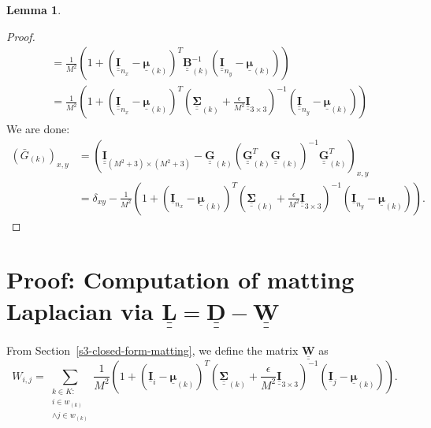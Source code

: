 \documentclass{article}
\theoremstyle{definition}
\newtheorem{lemma}[theorem]{Lemma}
\def\vt#1{\underline{\mathbf{#1}}}
\def\vts#1{\underline{\boldsymbol{#1}}}
\def\mt#1{\underline{\underline{\mathbf{#1}}}}
\def\mts#1{\underline{\underline{\boldsymbol{#1}}}}
\begin{document}
\begin{lemma}
\begin{proof}
\begin{align*}
            &= \frac1{M^2} \left(1 + \left(\mt I_{n_x} - \vts \mu_{(k)}\right)^T \mt B_{(k)}^{-1} \left(\mt I_{n_y} - \vts \mu_{(k)}\right)\right)\\
            &= \frac1{M^2} \left(1 + \left(\mt I_{n_x} - \vts \mu_{(k)}\right)^T \left(\mts \Sigma_{(k)}+\frac\epsilon{M^2}\mt I_{3\times 3}\right)^{-1} \left(\mt I_{n_y} - \vts \mu_{(k)}\right)\right)
        \end{align*}
        We are done:
        \begin{align*}
            \left({\bar{G}}_{(k)}\right)_{x,y} &= \left(\mt I_{(M^2+3)\times(M^2+3)} - \mt G_{(k)} \left(\mt G_{(k)}^T \mt G_{(k)}\right)^{-1} \mt G_{(k)}^T\right)_{x,y} \\
            &= \delta_{xy} - \frac1{M^2}\left(1 + \left(\vt{I}_{n_x} - \vts \mu_{(k)}\right)^T \left(\mts \Sigma_{(k)} + \frac\epsilon{M^2} \mt{I}_{3\times 3}\right)^{-1} \left(\vt{I}_{n_y} - \vts \mu_{(k)}\right) \right).
        \end{align*}
    \end{proof}
\end{lemma}



\section{Proof: Computation of matting Laplacian via $\mt L = \mt D - \mt W$} \label{appendix:w-sum-zero-proof}
From Section~\ref{s3-closed-form-matting}, we define the matrix $\mt W$ as
$$ W_{i,j} = \sum_{\substack{k\in K:\\i\in w_{(k)}\\\wedge j\in w_{(k)}}} \frac1{M^2}\left(1 + \left(\vt{I}_i - \vts \mu_{(k)}\right)^T \left(\mts \Sigma_{(k)} + \frac\epsilon{M^2} \mt{I}_{3\times 3}\right)^{-1} \left(\vt{I}_j - \vts \mu_{(k)}\right) \right). $$
\end{document}
